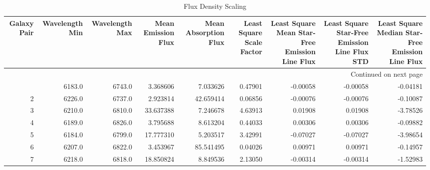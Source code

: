 \begin{longtable}{rrrrrrrrr}
\caption{Flux Density Scaling}\\
\toprule
 Galaxy Pair &  Wavelength Min &  Wavelength Max &  Mean Emission Flux &  Mean Absorption Flux &  Least Square Scale Factor &  Least Square Mean Star-Free Emission Line Flux &  Least Square Star-Free Emission Line Flux STD &  Least Square Median Star-Free Emission Line Flux \\
\midrule
\endhead
\midrule
\multicolumn{9}{r}{{Continued on next page}} \\
\midrule
\endfoot

\bottomrule
\endlastfoot
           1 &          6183.0 &          6743.0 &            3.368606 &              7.033626 &                    0.47901 &                                        -0.00058 &                                       -0.00058 &                                          -0.04181 \\
           2 &          6226.0 &          6737.0 &            2.923814 &             42.659414 &                    0.06856 &                                        -0.00076 &                                       -0.00076 &                                          -0.10087 \\
           3 &          6210.0 &          6810.0 &           33.637388 &              7.246678 &                    4.63913 &                                         0.01908 &                                        0.01908 &                                          -3.78526 \\
           4 &          6189.0 &          6826.0 &            3.795688 &              8.613204 &                    0.44033 &                                         0.00306 &                                        0.00306 &                                          -0.09882 \\
           5 &          6184.0 &          6799.0 &           17.777310 &              5.203517 &                    3.42991 &                                        -0.07027 &                                       -0.07027 &                                          -3.98654 \\
           6 &          6207.0 &          6822.0 &            3.453967 &             85.541495 &                    0.04026 &                                         0.00971 &                                        0.00971 &                                          -0.14957 \\
           7 &          6218.0 &          6818.0 &           18.850824 &              8.849536 &                    2.13050 &                                        -0.00314 &                                       -0.00314 &                                          -1.52983 \\

\end{longtable}
